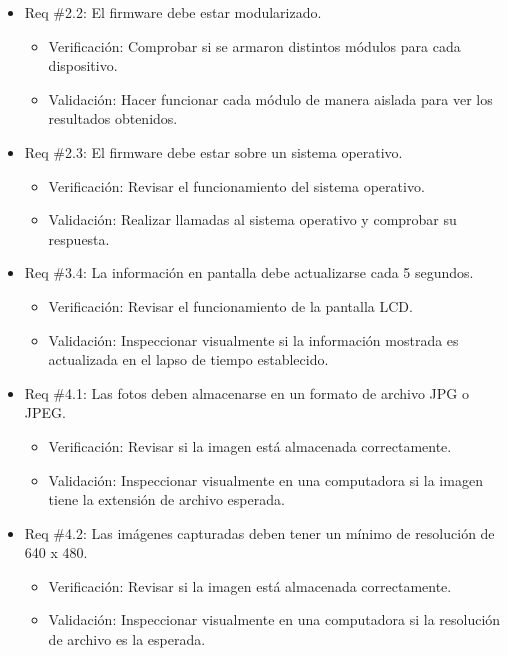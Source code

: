 \documentclass[
11pt, %
]{charter}
\begin{document}
\begin{itemize} 
\item Req \#2.2: El firmware debe estar modularizado.
\begin{itemize}
	\item Verificación: Comprobar si se armaron distintos módulos para cada dispositivo.
	\item Validación: Hacer funcionar cada módulo de manera aislada para ver los resultados obtenidos.
\end{itemize}
\end{itemize}

\begin{itemize} 
\item Req \#2.3: El firmware debe estar sobre un sistema operativo.
\begin{itemize}
	\item Verificación: Revisar el funcionamiento del sistema operativo.
	\item Validación: Realizar llamadas al sistema operativo y comprobar su respuesta.
\end{itemize}
\end{itemize}

\begin{itemize} 
\item Req \#3.4: La información en pantalla debe actualizarse cada 5 segundos.
\begin{itemize}
	\item Verificación: Revisar el funcionamiento de la pantalla LCD.
	\item Validación: Inspeccionar visualmente si la información mostrada es actualizada en el lapso de tiempo establecido.
\end{itemize}
\end{itemize}

\begin{itemize} 
\item Req \#4.1: Las fotos deben almacenarse en un formato de archivo JPG o JPEG.
\begin{itemize}
	\item Verificación: Revisar si la imagen está almacenada correctamente.
	\item Validación: Inspeccionar visualmente en una computadora si la imagen tiene la extensión de archivo esperada.
\end{itemize}
\end{itemize}

\begin{itemize} 
\item Req \#4.2: Las imágenes capturadas deben tener un mínimo de resolución de 640 x 480.
\begin{itemize}
	\item Verificación: Revisar si la imagen está almacenada correctamente.
	\item Validación: Inspeccionar visualmente en una computadora si la resolución de archivo es la esperada.
\end{itemize}
\end{itemize}
\end{document}
